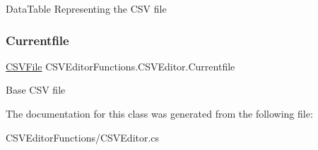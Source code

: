 Data\+Table Representing the C\+SV file 

\mbox{\label{class_c_s_v_editor_functions_1_1_c_s_v_editor_ad426611ea71bd6214812f5ddf23646b4}} 
\subsubsection{\texorpdfstring{Currentfile}{Currentfile}}
{\footnotesize\ttfamily \mbox{\hyperlink{class_c_s_v_editor_functions_1_1_c_s_v_file}{C\+S\+V\+File}} C\+S\+V\+Editor\+Functions.\+C\+S\+V\+Editor.\+Currentfile}



Base C\+SV file 



The documentation for this class was generated from the following file\+:\begin{DoxyCompactItemize}
\item 
C\+S\+V\+Editor\+Functions/C\+S\+V\+Editor.\+cs\end{DoxyCompactItemize}
